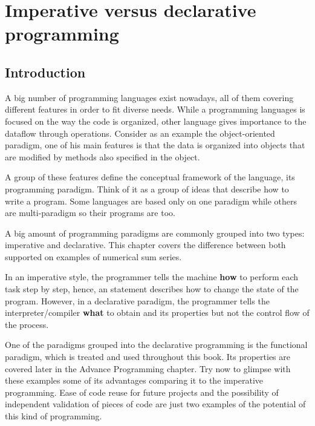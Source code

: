 
\newpage 
\chapter{Imperative versus declarative programming} 




\section{Introduction}
A big number of programming languages exist nowadays, all of them covering different features 
in order to fit diverse needs. While a programming languages is focused on the way the 
code is organized, other language gives importance to the dataflow through operations.
Consider as an example the object-oriented paradigm, one of his main features 
is that the data is organized into objects 
that are modified by methods also specified in the object.

A group of these features define the conceptual framework of the language, its programming paradigm.
Think of it as a group of ideas that describe how to write a program. Some languages are based only on one 
paradigm while others are multi-paradigm so their programs are too.  

A big amount of programming paradigms are commonly grouped into two types: imperative and declarative. 
This chapter covers the difference between both supported on examples of numerical sum series.

In an imperative style, the programmer tells the machine \textbf{how} to perform each task step by step,
hence, an statement describes how to change the state of the program.
However, in a declarative paradigm, the programmer tells the interpreter/compiler \textbf{what} to obtain
and its properties but not the control flow of the process. 

One of the paradigms grouped into the declarative programming is the functional paradigm, which is treated 
and used throughout this book. Its properties are covered later in the Advance Programming chapter. 
Try now to glimpse with these examples some of its advantages comparing it to the imperative programming.
Ease of code reuse for future projects and the possibility of independent validation of pieces of code are
just two examples of the potential of this kind of programming.  
 





